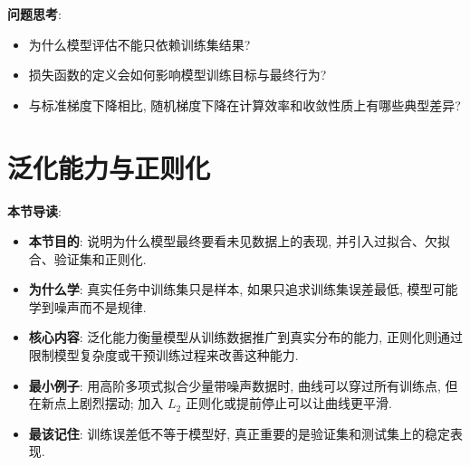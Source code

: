 \documentclass{../nndlcourse}
\begin{document}
\textbf{问题思考}: 

\begin{itemize}
  \item 为什么模型评估不能只依赖训练集结果?
  \item 损失函数的定义会如何影响模型训练目标与最终行为?
  \item 与标准梯度下降相比, 随机梯度下降在计算效率和收敛性质上有哪些典型差异?
\end{itemize}


\section{泛化能力与正则化}

\textbf{本节导读}:
\begin{itemize}
  \item \textbf{本节目的}: 说明为什么模型最终要看未见数据上的表现, 并引入过拟合、欠拟合、验证集和正则化.
  \item \textbf{为什么学}: 真实任务中训练集只是样本, 如果只追求训练集误差最低, 模型可能学到噪声而不是规律.
  \item \textbf{核心内容}: 泛化能力衡量模型从训练数据推广到真实分布的能力, 正则化则通过限制模型复杂度或干预训练过程来改善这种能力.
  \item \textbf{最小例子}: 用高阶多项式拟合少量带噪声数据时, 曲线可以穿过所有训练点, 但在新点上剧烈摆动; 加入 $L_2$ 正则化或提前停止可以让曲线更平滑.
  \item \textbf{最该记住}: 训练误差低不等于模型好, 真正重要的是验证集和测试集上的稳定表现.
\end{itemize}
\end{document}
